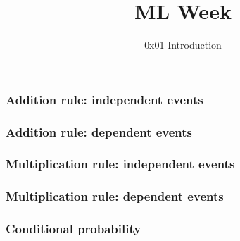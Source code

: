 
\title
{ML Week}
\subtitle{0x01 \hspace{2mm}  Introduction}




\begin{frame}
  \titlepage
\end{frame}


\begin{frame}
\end{frame}

\begin{frame}
\end{frame}

\begin{frame}
\end{frame}

\begin{frame}
\end{frame}

\begin{frame}
\end{frame}

\begin{frame}
  \frametitle{Addition rule: independent events}
\end{frame}

\begin{frame}
  \frametitle{Addition rule: dependent events}
\end{frame}

\begin{frame}
  \frametitle{Multiplication rule: independent events}
\end{frame}

\begin{frame}
  \frametitle{Multiplication rule: dependent events}
\end{frame}

\begin{frame}
  \frametitle{Conditional probability}
\end{frame}

